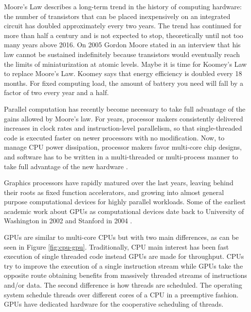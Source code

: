 \documentclass[Afour,sageh,times]{sagej}
\begin{document}
Moore's Law describes a long-term trend in the history of computing
hardware: the number of transistors that can be placed inexpensively
on an integrated circuit has doubled approximately every two
years. The trend has continued for more than half a century and is not
expected to stop, theoretically until not too many years above
2016. On 2005 Gordon Moore stated in an interview that his law cannot
be sustained indefinitely because transistors would eventually reach
the limits of miniaturization at atomic levels. Maybe it is time for
Koomey's Law \citep{10.1109/MAHC.2010.28} to replace Moore's
Law. Koomey says that energy efficiency is doubled every 18
months. For fixed computing load, the amount of battery you need will
fall by a factor of two every year and a half.

Parallel computation has recently become necessary to take full
advantage of the gains allowed by Moore's law. For years, processor
makers consistently delivered increases in clock rates and
instruction-level parallelism, so that single-threaded code is
executed faster on newer processors with no modification. Now, to
manage CPU power dissipation, processor makers favor multi-core chip
designs, and software has to be written in a multi-threaded or
multi-process manner to take full advantage of the new hardware \citep{6307773}.

Graphics processors have rapidly matured over the last years, leaving
behind their roots as fixed function accelerators, and growing into
almost general purpose computational devices for highly parallel
workloads. Some of the earliest academic work about GPUs as
computational devices date back to University of Washington in 2002
\citep{Thompson:2002:UMG:774861.774894} and Stanford in 2004
\citep{Buck:2004:BGS:1015706.1015800}.  %

GPUs are similar to multi-core CPUs but with two main differences,
as can be seen in Figure \ref{fig:cpu-gpu}. Traditionally, CPU
main interest has been fast execution of single threaded code instead
GPUs are made for throughput. CPUs try to improve the execution of a
single instruction stream while GPUs take the opposite route obtaining
benefits from massively threaded streams of instructions and/or
data. The second difference is how threads are scheduled. The
operating system schedule threads over different cores of a CPU in a
preemptive fashion. GPUs have dedicated hardware for the cooperative
scheduling of threads.

\begin{figure*}[!h]
\centering
{}
\caption{CPU and GPU block diagram comparison.}
\label{fig:cpu-gpu}
\end{figure*}
\end{document}
